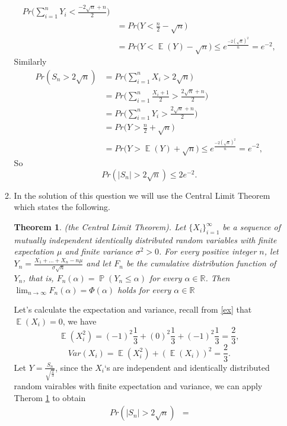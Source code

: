 \documentclass[a4paper, 11pt, oneside]{article}
\newtheorem{theorem}{Theorem}[section]
\newcommand{\R}{\mathbb{R}}
\newcommand\abs[1]{\left|#1\right|}
\DeclareMathOperator{\EX}{\mathbb{E}}
\DeclareMathOperator{\PX}{\mathbb{P}}
\begin{document}
\begin{enumerate}
\begin{enumerate}
\begin{align*}
 Pr\bigg(\sum_{i=1}^nY_i<\frac{-2\sqrt{n}+n}{2}\bigg)\\&=
 Pr\bigg(Y<\frac{n}{2} - \sqrt{n}\bigg)\\&=
  Pr\bigg(Y<\EX(Y) - \sqrt{n}\bigg) \leq e^{\frac{-2(\sqrt{n})^2}{n}} = e^{-2},
\end{align*}
Similarly
\begin{align*}
 Pr(S_n>2\sqrt{n}) &=
 Pr\bigg(\sum_{i=1}^nX_i>2\sqrt{n}\bigg) \\&=
 Pr\bigg(\sum_{i=1}^n\frac{X_i+1}{2}>\frac{2\sqrt{n}+n}{2}\bigg)\\&=
 Pr\bigg(\sum_{i=1}^nY_i>\frac{2\sqrt{n}+n}{2}\bigg)\\&=
 Pr\bigg(Y>\frac{n}{2} + \sqrt{n}\bigg)\\&=
  Pr\bigg(Y>\EX(Y) + \sqrt{n}\bigg) \leq e^{\frac{-2(\sqrt{n})^2}{n}} = e^{-2},
\end{align*}
So
\begin{equation*}
Pr(\abs{S_n}>2\sqrt{n}) \leq 2 e^{-2}.
 \end{equation*}
 \item  In the solution of this question we will use the Central Limit Theorem which states the following.
\begin{theorem} 
\label{central}
(the Central Limit Theorem). Let $\{X_i\}^\infty_{i=1}$ be a sequence of mutually independent identically distributed random variables 
with finite expectation $\mu$ and finite variance $\sigma^2>0$. For every positive integer $n$, let $Y_n = \frac{X_1 + \ldots + X_n - n \mu}{\sigma\sqrt{n}}$
and let $F_n$ be the cumulative distribution function of $Y_n$, that is, $F_n(\alpha) = \PX(Y_n\leq\alpha)$ for every $\alpha\in \R$. 
Then $\lim_{n \to \infty} F_n(\alpha) = \Phi(\alpha)$ holds for every $\alpha \in \R$
\end{theorem} 
Let's calculate the expectation and variance, recall from \ref{ex} that $\EX(X_i) = 0$, we have
\begin{equation*}
\EX(X_i^2) = (-1)^2 \frac{1}{3} + (0)^2 \frac{1}{3} + (-1)^2 \frac{1}{3} = \frac{2}{3},
 \end{equation*}
\begin{equation*}
Var(X_i) = \EX(X_i^2) + (\EX(X_i))^2 = \frac{2}{3}.
 \end{equation*}
 Let $Y = \frac{S_n}{\sqrt{\frac{2}{3}}}$,
since the $X_i$`s are independent and identically distributed random vairables with finite expectation and variance, 
 we can apply Therom \ref{central} to obtain
 \begin{align*}
Pr(\abs{S_n}>2\sqrt{n}) &=

\end{align*}
\end{enumerate}
\end{enumerate}
\end{document}
